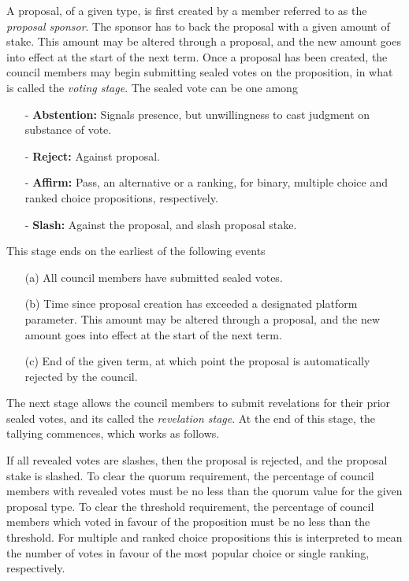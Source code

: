 \documentclass{article}
\begin{document}
A proposal, of a given type, is first created by a member referred to as the \textit{proposal sponsor}. The sponsor has to back the proposal with a given amount of stake. This amount may be altered through a proposal, and the new amount goes into effect at the start of the next term. Once a proposal has been created, the council members may begin submitting sealed votes on the proposition, in what is called the \textit{voting stage}. The sealed vote can be one among

\begin{itemize}
  \item[-] \textbf{Abstention:} Signals presence, but unwillingness to cast judgment on substance of vote.
  \item[-] \textbf{Reject:} Against proposal.
  \item[-] \textbf{Affirm:} Pass, an alternative or a ranking, for binary, multiple choice and ranked choice propositions, respectively.
  \item[-] \textbf{Slash:} Against the proposal, and slash proposal stake.
\end{itemize}

This stage ends on the earliest of the following events

\begin{enumerate}
  \item[(a)] All council members have submitted sealed votes.
  \item[(b)] Time since proposal creation has exceeded a designated platform parameter. This amount may be altered through a proposal, and the new amount goes into effect at the start of the next term.
  \item[(c)] End of the given term, at which point the proposal is automatically rejected by the council.
\end{enumerate}

The next stage allows the council members to submit revelations for their prior sealed votes, and its called the \textit{revelation stage}. At the end of this stage, the tallying commences, which works as follows.

If all revealed votes are slashes, then the proposal is rejected, and the proposal stake is slashed. To clear the quorum requirement, the percentage of council members with revealed votes must be no less than the quorum value for the given proposal type. To clear the threshold requirement, the percentage of council members which voted in favour of the proposition must be no less than the threshold. For multiple and ranked choice propositions this is interpreted to mean the number of votes in favour of the most popular choice or single ranking, respectively.
\end{document}
